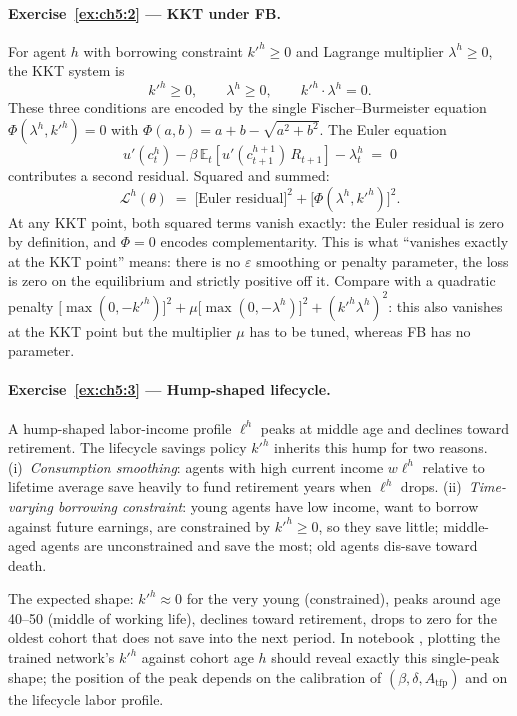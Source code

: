 \documentclass[11pt,a4paper]{report}
\begin{document}
\paragraph{Exercise~\ref{ex:ch5:2} --- KKT under FB.}
For agent $h$ with borrowing constraint $k'^h \ge 0$ and Lagrange multiplier $\lambda^h \ge 0$, the KKT system is
\[
   k'^h \ge 0, \qquad \lambda^h \ge 0, \qquad k'^h \cdot \lambda^h = 0.
\]
These three conditions are encoded by the single Fischer--Burmeister equation $\Phi(\lambda^h, k'^h) = 0$ with $\Phi(a,b) = a + b - \sqrt{a^2 + b^2}$.  The Euler equation
\[
   u'(c^h_t) - \beta\,\mathbb{E}_t[u'(c^{h+1}_{t+1})\,R_{t+1}] - \lambda^h_t \;=\; 0
\]
contributes a second residual.  Squared and summed:
\[
   \mathcal{L}^h(\theta) \;=\; \bigl[\text{Euler residual}\bigr]^2 + \bigl[\Phi(\lambda^h, k'^h)\bigr]^2.
\]
At any KKT point, both squared terms vanish exactly: the Euler residual is zero by definition, and $\Phi = 0$ encodes complementarity.  This is what ``vanishes exactly at the KKT point'' means: there is no $\varepsilon$ smoothing or penalty parameter, the loss is zero on the equilibrium and strictly positive off it.  Compare with a quadratic penalty $\bigl[\max(0, -k'^h)\bigr]^2 + \mu \bigl[\max(0, -\lambda^h)\bigr]^2 + (k'^h \lambda^h)^2$: this also vanishes at the KKT point but the multiplier $\mu$ has to be tuned, whereas FB has no parameter.

\paragraph{Exercise~\ref{ex:ch5:3} --- Hump-shaped lifecycle.}
A hump-shaped labor-income profile $\ell^h$ peaks at middle age and declines toward retirement.  The lifecycle savings policy $k'^h$ inherits this hump for two reasons.  (i)~\emph{Consumption smoothing}: agents with high current income $w \ell^h$ relative to lifetime average save heavily to fund retirement years when $\ell^h$ drops.  (ii)~\emph{Time-varying borrowing constraint}: young agents have low income, want to borrow against future earnings, are constrained by $k'^h \ge 0$, so they save little; middle-aged agents are unconstrained and save the most; old agents dis-save toward death.

The expected shape: $k'^h \approx 0$ for the very young (constrained), peaks around age 40--50 (middle of working life), declines toward retirement, drops to zero for the oldest cohort that does not save into the next period.  In notebook , plotting the trained network's $k'^h$ against cohort age $h$ should reveal exactly this single-peak shape; the position of the peak depends on the calibration of $(\beta, \delta, A_\mathrm{tfp})$ and on the lifecycle labor profile.
\end{document}
